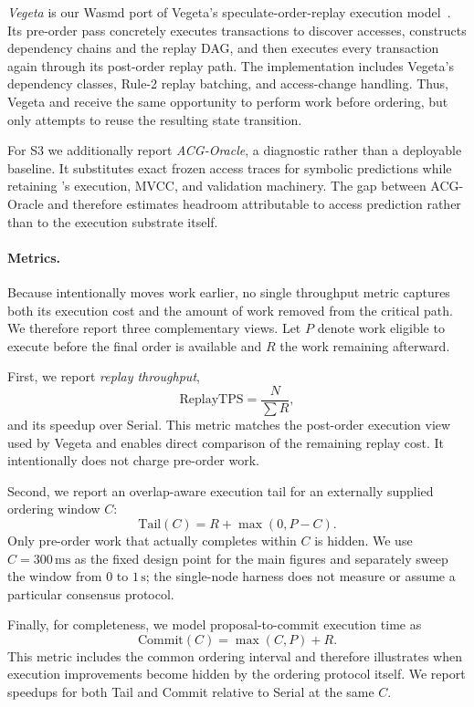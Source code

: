 \emph{Vegeta} is our Wasmd port of Vegeta's speculate-order-replay execution model~\cite{xu2025vegeta}. Its pre-order pass concretely executes transactions to discover accesses, constructs dependency chains and the replay DAG, and then executes every transaction again through its post-order replay path. The implementation includes Vegeta's dependency classes, Rule-2 replay batching, and access-change handling. Thus, Vegeta and \system receive the same opportunity to perform work before ordering, but only \system attempts to reuse the resulting state transition.

For S3 we additionally report \emph{ACG-Oracle}, a diagnostic rather than a deployable baseline. It substitutes exact frozen access traces for symbolic predictions while retaining \system's execution, MVCC, and validation machinery. The gap between ACG-Oracle and \system therefore estimates headroom attributable to access prediction rather than to the execution substrate itself.

\paragraph{Metrics.}
Because \system intentionally moves work earlier, no single throughput metric captures both its execution cost and the amount of work removed from the critical path. We therefore report three complementary views. Let $P$ denote work eligible to execute before the final order is available and $R$ the work remaining afterward.

First, we report \emph{replay throughput},
\[
    \mathrm{ReplayTPS} = \frac{N}{\sum R},
\]
and its speedup over Serial. This metric matches the post-order execution view used by Vegeta and enables direct comparison of the remaining replay cost. It intentionally does not charge pre-order work.

Second, we report an overlap-aware execution tail for an externally supplied ordering window $C$:
\[
    \mathrm{Tail}(C) = R + \max(0, P-C).
\]
Only pre-order work that actually completes within $C$ is hidden. We use $C=300\,\mathrm{ms}$ as the fixed design point for the main figures and separately sweep the window from $0$ to $1\,\mathrm{s}$; the single-node harness does not measure or assume a particular consensus protocol.

Finally, for completeness, we model proposal-to-commit execution time as
\[
    \mathrm{Commit}(C) = \max(C,P) + R.
\]
This metric includes the common ordering interval and therefore illustrates when execution improvements become hidden by the ordering protocol itself. We report speedups for both Tail and Commit relative to Serial at the same $C$.

